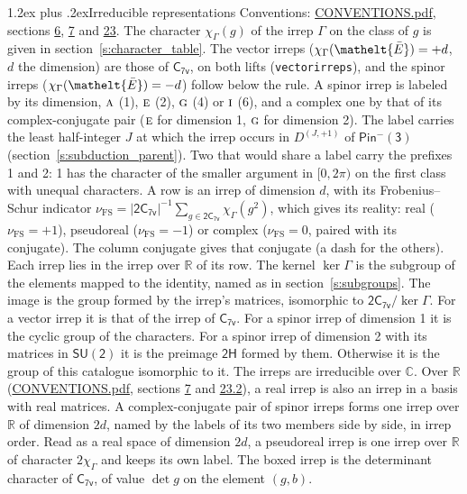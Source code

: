 \documentclass[10pt,a4paper]{article}
\makeatletter
\renewcommand\section{\@startsection{section}{1}{\z@}{-3ex plus -1ex minus -.2ex}%
  {1.2ex plus .2ex}{\normalfont\large\sffamily\bfseries\color{parttitle}}}
\numberwithin{equation}{section}
\newcommand{\eltfont}[1]{{\let\sigma\eltsigma\mathelt{#1}}}
\newcommand{\grp}[1]{\mathsf{#1}}
\newcommand{\irr}[1]{\text{\normalfont\scshape #1}}
\newcommand{\elt}[1]{\eltfont{#1}}
\newcommand{\irrJp}[2]{D^{(#1,#2)}}
\newcommand{\irchar}[1]{\chi_{#1}}
\newcommand{\fsind}{\nu_{\mathrm{FS}}}
\newcommand{\barred}[1]{\bar{#1}}
\makeatother
\begin{document}
\section{Irreducible representations}\label{s:irreps}
Conventions: \href{../../CONVENTIONS.pdf}{CONVENTIONS.pdf}, sections \href{../../../rotation/CONVENTIONS.pdf\#conv.6}{6}, \href{../../../rotation/CONVENTIONS.pdf\#conv.7}{7} and \href{../../CONVENTIONS.pdf\#conv.23}{23}.
\leavevmode\label{n:function.character}\label{n:irrep.Gamma}The character $\irchar{\Gamma}(g)$ of the irrep $\Gamma$ on the class of $g$ is given in section~\ref{s:character_table}. \label{n:index.dimension}The vector irreps ($\irchar{\Gamma}(\elt{\barred{E}}) = +d$, $d$ the dimension) are those of \href{../../../rotation/data/pdf/C7v.pdf}{$\grp{C_{7v}}$}, on both lifts (\texttt{vectorirreps}), and the spinor irreps ($\irchar{\Gamma}(\elt{\barred{E}}) = -d$) follow below the rule. A spinor irrep is labeled by its dimension, $\irr{a}$ (1), $\irr{e}$ (2), $\irr{g}$ (4) or $\irr{i}$ (6), and a complex one by that of its complex-conjugate pair ($\irr{e}$ for dimension 1, $\irr{g}$ for dimension 2). The label carries the least half-integer $J$ at which the irrep occurs in $\irrJp{J}{+1}$ of $\grp{Pin^{-}(3)}$ (section~\ref{s:subduction_parent}). Two that would share a label carry the prefixes 1 and 2: 1 has the character of the smaller argument in $[0, 2\pi)$ on the first class with unequal characters.
\leavevmode\label{n:index.frobenius}\label{n:head.irrep}\label{n:head.reality}A row is an irrep of dimension $d$, with its Frobenius--Schur indicator $\fsind = |\grp{2C_{7v}}|^{-1}\allowbreak\sum_{g\in\grp{2C_{7v}}}\irchar{\Gamma}(g^2)$, which gives its reality: real ($\fsind = +1$), pseudoreal ($\fsind = -1$) or complex ($\fsind = 0$, paired with its conjugate). \label{n:head.conjugate}The column conjugate gives that conjugate (a dash for the others). \label{n:head.over.real}Each irrep lies in the irrep over $\mathbb{R}$ of its row. \label{n:head.kernel}The kernel $\ker\Gamma$ is the subgroup of the elements mapped to the identity, named as in section~\ref{s:subgroups}. \label{n:head.image}The image is the group formed by the irrep's matrices, isomorphic to $\grp{2C_{7v}}/\ker\Gamma$. For a vector irrep it is that of the irrep of \href{../../../rotation/data/pdf/C7v.pdf}{$\grp{C_{7v}}$}. For a spinor irrep of dimension 1 it is the cyclic group of the characters. For a spinor irrep of dimension 2 with its matrices in $\grp{SU(2)}$ it is the preimage $\grp{2H}$ formed by them. Otherwise it is the group of this catalogue isomorphic to it. The irreps are irreducible over $\mathbb{C}$. Over $\mathbb{R}$ (\href{../../CONVENTIONS.pdf}{CONVENTIONS.pdf}, sections \href{../../../rotation/CONVENTIONS.pdf\#conv.7}{7} and \href{../../CONVENTIONS.pdf\#conv.23.2}{23.2}), a real irrep is also an irrep in a basis with real matrices. A complex-conjugate pair of spinor irreps forms one irrep over $\mathbb{R}$ of dimension $2d$, named by the labels of its two members side by side, in irrep order. Read as a real space of dimension $2d$, a pseudoreal irrep is one irrep over $\mathbb{R}$ of character $2\irchar{\Gamma}$ and keeps its own label. \label{n:mark.determinant}The boxed irrep is the determinant character of \href{../../../rotation/data/pdf/C7v.pdf}{$\grp{C_{7v}}$}, of value $\det g$ on the element $(g, b)$.
\end{document}
